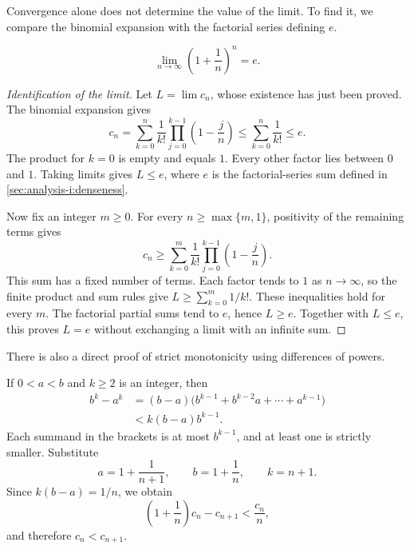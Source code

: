 Convergence alone does not determine the value of the limit. To find it,
we compare the binomial expansion with the factorial series defining $e$.

\begin{proposition}
  \label{thm:analysis-i:binomial-limit}
  \[
    \lim_{n\to\infty}\left(1+\frac1n\right)^n=e.
  \]
\end{proposition}

\begin{proof}[Identification of the limit]
  Let $L=\lim c_n$, whose existence has just been proved. The binomial
  expansion gives
  \[
    c_n=\sum_{k=0}^{n}\frac{1}{k!}
      \prod_{j=0}^{k-1}\left(1-\frac{j}{n}\right)
    \le\sum_{k=0}^{n}\frac{1}{k!}\le e.
  \]
  The product for $k=0$ is empty and equals $1$. Every other factor
  lies between $0$ and $1$. Taking limits gives $L\le e$, where $e$
  is the factorial-series sum defined in
  \autoref{sec:analysis-i:denseness}.

  Now fix an integer $m\ge0$. For every $n\ge\max\{m,1\}$, positivity
  of the remaining terms gives
  \[
    c_n\ge\sum_{k=0}^{m}\frac{1}{k!}
      \prod_{j=0}^{k-1}\left(1-\frac{j}{n}\right).
  \]
  This sum has a fixed number of terms. Each factor tends to $1$ as
  $n\to\infty$, so the finite product and sum rules give
  $L\ge\sum_{k=0}^{m}1/k!$. These inequalities hold for every $m$.
  The factorial partial sums tend to $e$, hence $L\ge e$.
  Together with $L\le e$, this proves $L=e$ without exchanging a
  limit with an infinite sum.
\end{proof}


There is also a direct proof of strict monotonicity using differences
of powers.

\begin{example}
  \label{ex:analysis-i:binomial-sequence-powers}
  If $0<a<b$ and $k\ge2$ is an integer, then
  \begin{align*}
    b^k-a^k
      &=(b-a)\bigl(b^{k-1}+b^{k-2}a+\cdots+a^{k-1}\bigr)\\
      &<k(b-a)b^{k-1}.
  \end{align*}
  Each summand in the brackets is at most $b^{k-1}$, and at least one
  is strictly smaller. Substitute
  \[
    a=1+\frac{1}{n+1},\qquad b=1+\frac1n,\qquad k=n+1.
  \]
  Since $k(b-a)=1/n$, we obtain
  \[
    \left(1+\frac1n\right)c_n-c_{n+1}<\frac{c_n}{n},
  \]
  and therefore $c_n<c_{n+1}$.
\end{example}

